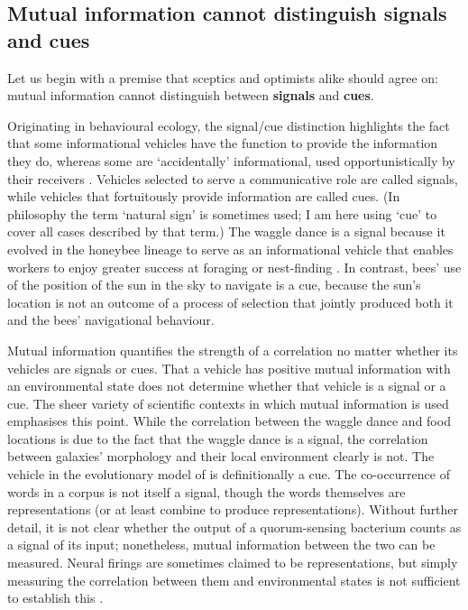\subsection{Mutual information cannot distinguish signals and cues}

Let us begin with a premise that sceptics and optimists alike should agree on: mutual information cannot distinguish between \textbf{signals} and \textbf{cues}.

Originating in behavioural ecology, the signal/cue distinction highlights the fact that some informational vehicles have the function to provide the information they do, whereas some are `accidentally' informational, used opportunistically by their receivers \citep[$\S$1.2]{maynardsmith2003animal}.
Vehicles selected to serve a communicative role are called signals, while vehicles that fortuitously provide information are called cues.
(In philosophy the term `natural sign' is sometimes used; I am here using `cue' to cover all cases described by that term.)
The waggle dance is a signal because it evolved in the honeybee lineage to serve as an informational vehicle that enables workers to enjoy greater success at foraging or nest-finding \citep{gould1975honey,riley2005flight}.
In contrast, bees' use of the position of the sun in the sky to navigate is a cue, because the sun's location is not an outcome of a process of selection that jointly produced both it and the bees' navigational behaviour.

Mutual information quantifies the strength of a correlation no matter whether its vehicles are signals or cues.
That a vehicle has positive mutual information with an environmental state does not determine whether that vehicle is a signal or a cue.
The sheer variety of scientific contexts in which mutual information is used emphasises this point.
While the correlation between the waggle dance and food locations is due to the fact that the waggle dance is a signal, the correlation between galaxies' morphology and their local environment clearly is not.
The vehicle in the evolutionary model of \citet{donaldson-matasci2010fitness} is definitionally a cue.
The co-occurrence of words in a corpus is not itself a signal, though the words themselves are representations (or at least combine to produce representations).
Without further detail, it is not clear whether the output of a quorum-sensing bacterium counts as a signal of its input; nonetheless, mutual information between the two can be measured.
Neural firings are sometimes claimed to be representations, but simply measuring the correlation between them and environmental states is not sufficient to establish this \citep{rathkopf2017neural}.

